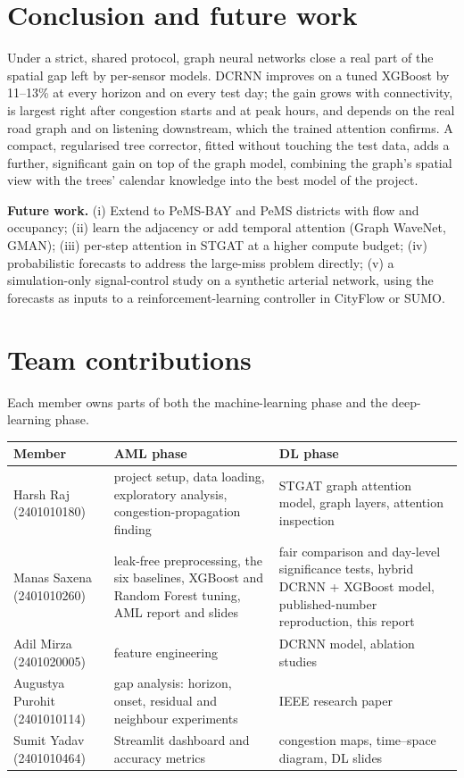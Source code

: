 \documentclass[11pt,a4paper]{article}
\begin{document}
\section{Conclusion and future work}\label{sec:conclusion}
Under a strict, shared protocol, graph neural networks close a real part of the spatial gap left by per-sensor models.
DCRNN improves on a tuned XGBoost by 11--13\% at every horizon and on every test day; the gain grows with connectivity,
is largest right after congestion starts and at peak hours, and depends on the real road graph and on listening
downstream, which the trained attention confirms. A compact, regularised tree corrector, fitted without touching the test
data, adds a further, significant gain on top of the graph model, combining the graph's spatial view with the trees'
calendar knowledge into the best model of the project.

\textbf{Future work.} (i) Extend to PeMS-BAY and PeMS districts with flow and occupancy; (ii) learn the adjacency or add
temporal attention (Graph WaveNet, GMAN); (iii) per-step attention in STGAT at a higher compute budget; (iv) probabilistic
forecasts to address the large-miss problem directly; (v) a simulation-only signal-control study on a synthetic arterial
network, using the forecasts as inputs to a reinforcement-learning controller in CityFlow or SUMO.

\section*{Team contributions}
Each member owns parts of both the machine-learning phase and the deep-learning phase.
\begin{table}[H]
\centering
\small
\begin{tabularx}{\linewidth}{@{}lXX@{}}
\toprule
Member & AML phase & DL phase \\
\midrule
Harsh Raj (2401010180) & project setup, data loading, exploratory analysis, congestion-propagation finding & STGAT graph attention model, graph layers, attention inspection \\
Manas Saxena (2401010260) & leak-free preprocessing, the six baselines, XGBoost and Random Forest tuning, AML report and slides & fair comparison and day-level significance tests, hybrid DCRNN + XGBoost model, published-number reproduction, this report \\
Adil Mirza (2401020005) & feature engineering & DCRNN model, ablation studies \\
Augustya Purohit (2401010114) & gap analysis: horizon, onset, residual and neighbour experiments & IEEE research paper \\
Sumit Yadav (2401010464) & Streamlit dashboard and accuracy metrics & congestion maps, time--space diagram, DL slides \\
\bottomrule
\end{tabularx}
\end{table}
\end{document}
